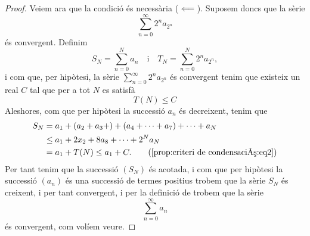 \documentclass[../../Main.tex]{subfiles}
\begin{document}
\begin{proposition}
\begin{proof}
			Veiem ara que la condició és necessària (\(\impliedby\)). Suposem doncs que la sèrie
			\[\sum_{n=0}^{\infty}2^{n}a_{2^{n}}\]
			és convergent. Definim
			\[S_{N}=\sum_{n=0}^{N}a_{n}\quad\text{i}\quad T_{N}=\sum_{n=0}^{N}2^{n}a_{2^{n}},\]
			i com que, per hipòtesi, la sèrie \(\sum_{n=0}^{\infty}2^{n}a_{2^{n}}\) és convergent tenim que existeix un real \(C\) tal que per a tot \(N\) es satisfà
			\begin{equation}
				\label{prop:criteri de condensació:eq2}
				T(N)\leq C
			\end{equation}
			Aleshores, com que per hipòtesi la successió \(a_{n}\) és decreixent, tenim que
			\begin{align*}
				S_{N}&=a_{1}+(a_{2}+a_{3}+)+(a_{4}+\dots+a_{7})+\dots+a_{N} \\
				&\leq a_{1}+2x_{2}+8a_{8}+\dots+2^{N}a_{N} \\
				&=a_{1}+T(N)\leq a_{1}+C.\tag{\ref{prop:criteri de condensació:eq2}}
			\end{align*}
			Per tant tenim que la successió \((S_{N})\) és acotada, i com que per hipòtesi la successió \((a_{n})\) és una successió de termes positius trobem que la sèrie \(S_{N}\) és creixent, i per tant convergent, %
			i per la definició de  trobem que la sèrie
			\[\sum_{n=0}^{\infty}a_{n}\]
			és convergent, com volíem veure.
		\end{proof}
	\end{proposition}
\end{document}
